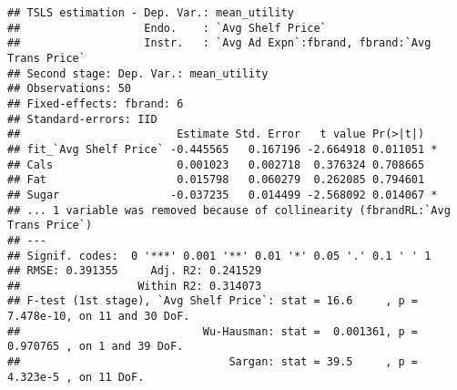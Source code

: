 \documentclass[
]{article}
\begin{document}
\begin{verbatim}
## TSLS estimation - Dep. Var.: mean_utility
##                   Endo.    : `Avg Shelf Price`
##                   Instr.   : `Avg Ad Expn`:fbrand, fbrand:`Avg Trans Price`
## Second stage: Dep. Var.: mean_utility
## Observations: 50
## Fixed-effects: fbrand: 6
## Standard-errors: IID 
##                        Estimate Std. Error   t value Pr(>|t|)    
## fit_`Avg Shelf Price` -0.445565   0.167196 -2.664918 0.011051 *  
## Cals                   0.001023   0.002718  0.376324 0.708665    
## Fat                    0.015798   0.060279  0.262085 0.794601    
## Sugar                 -0.037235   0.014499 -2.568092 0.014067 *  
## ... 1 variable was removed because of collinearity (fbrandRL:`Avg Trans Price`)
## ---
## Signif. codes:  0 '***' 0.001 '**' 0.01 '*' 0.05 '.' 0.1 ' ' 1
## RMSE: 0.391355     Adj. R2: 0.241529
##                  Within R2: 0.314073
## F-test (1st stage), `Avg Shelf Price`: stat = 16.6     , p = 7.478e-10, on 11 and 30 DoF.
##                            Wu-Hausman: stat =  0.001361, p = 0.970765 , on 1 and 39 DoF.
##                                Sargan: stat = 39.5     , p = 4.323e-5 , on 11 DoF.
\end{verbatim}
\end{document}
